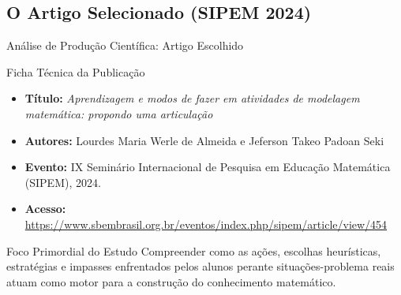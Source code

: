 \documentclass[10pt, aspectratio=169]{beamer}
\begin{document}
\subsection[Artigo (SIPEM 2024)]{O Artigo Selecionado (SIPEM 2024)}
\begin{frame}{Análise de Produção Científica: Artigo Escolhido}
    \transdissolve[duration=0.4]
    \begin{block}{Ficha Técnica da Publicação}
        \begin{itemize}
            \item \textbf{Título:} \emph{Aprendizagem e modos de fazer em atividades de modelagem matemática: propondo uma articulação}
            \item \textbf{Autores:} Lourdes Maria Werle de Almeida e Jeferson Takeo Padoan Seki
            \item \textbf{Evento:} IX Seminário Internacional de Pesquisa em Educação Matemática (SIPEM), 2024.
            \item \textbf{Acesso:} \url{https://www.sbembrasil.org.br/eventos/index.php/sipem/article/view/454}
        \end{itemize}
    \end{block}
    \pause
    \begin{alertblock}{Foco Primordial do Estudo}
        Compreender como as ações, escolhas heurísticas, estratégias e impasses enfrentados pelos alunos perante situações-problema reais atuam como motor para a construção do conhecimento matemático.
    \end{alertblock}
\end{frame}
\end{document}
